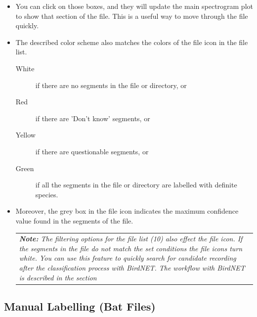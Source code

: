 \documentclass{scrartcl}
\begin{document}
\begin{itemize}
\item You can click on those boxes, and they will update the main spectrogram plot to show that section of the file. This is a useful way to move through the file quickly.
\item The described color scheme also matches the colors of the file icon in the file list. 
	\begin{description}
		\item[White]  if there are no segments in the file or directory, or
		\item[Red] if there are 'Don't know' segments, or
		\item[Yellow] if there are questionable segments, or
		\item[Green] if all the segments in the file or directory are labelled with definite species.
	\end{description}
	\item Moreover, the grey box in the file icon indicates the maximum confidence value found in the segments of the file.
	\begin{table}[h!]
		\centering
		\begin{tabular}{p{}}
			\textit{\textbf{Note:} The filtering options for the file list (10) also effect the file icon. If the segments in the file do not match the set conditions the file icons turn white. You can use this feature to quickly search for candidate recording after the classification process with BirdNET. The workflow with BirdNET is described in the section \nameref{sec:BirdNET}}\\
		\end{tabular}
	\end{table}
\end{itemize}

\subsection{Manual Labelling (Bat Files) \label{sec:bats}}
\end{document}
